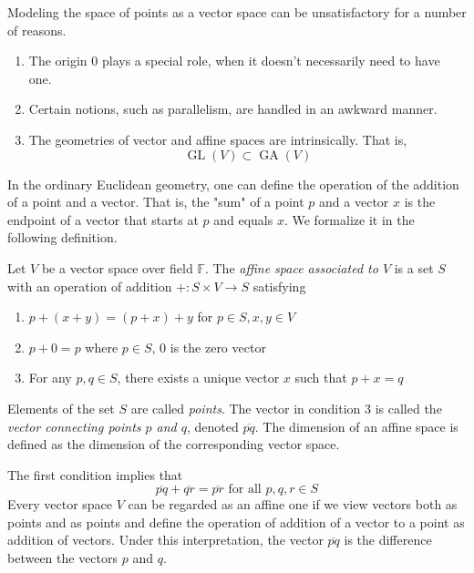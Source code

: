 \documentclass{article}
\DeclareMathOperator{\GL}{GL}
\DeclareMathOperator{\GA}{GA}
\begin{document}
    Modeling the space of points as a vector space can be unsatisfactory for a number of reasons. 
    \begin{enumerate}
      \item The origin $0$ plays a special role, when it doesn't necessarily need to have one. 
      \item Certain notions, such as parallelism, are handled in an awkward manner. 
      \item The geometries of vector and affine spaces are intrinsically. That is, 
        \begin{equation}
          \GL(V) \subset \GA(V)
        \end{equation}
    \end{enumerate}

    In the ordinary Euclidean geometry, one can define the operation of the addition of a point and a vector. That is, the "sum" of a point $p$ and a vector $x$ is the endpoint of a vector that starts at $p$ and equals $x$. We formalize it in the following definition. 

    \begin{definition}
      Let $V$ be a vector space over field $\mathbb{F}$. The \textit{affine space associated to $V$} is a set $S$ with an operation of addition $+: S \times V \longrightarrow S$ satisfying 
      \begin{enumerate}
        \item $p + (x + y) = (p + x) + y$ for $p \in S, x, y \in V$
        \item $p + 0 = p$ where $p \in S$, $0$ is the zero vector 
        \item For any $p, q \in S$, there exists a unique vector $x$ such that $p + x = q$
      \end{enumerate}
      Elements of the set $S$ are called \textit{points}. The vector in condition 3 is called the \textit{vector connecting points $p$ and $q$}, denoted $\overline{pq}$. The dimension of an affine space is defined as the dimension of the corresponding vector space. 
    \end{definition}

    The first condition implies that
    \begin{equation}
      \overline{pq} + \overline{qr} = \overline{pr} \text{ for all } p, q, r \in S
    \end{equation}
    Every vector space $V$ can be regarded as an affine one if we view vectors both as points and as points and define the operation of addition of a vector to a point as addition of vectors. Under this interpretation, the vector $\overline{pq}$ is the difference between the vectors $p$ and $q$. 
\end{document}
